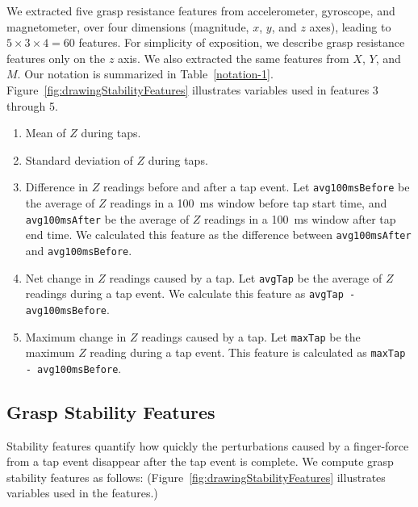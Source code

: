 We extracted five grasp resistance features from accelerometer, gyroscope, and magnetometer, over four dimensions (magnitude, $x$, $y$, and $z$ axes), leading to $5 \times 3 \times 4 = 60$ features. For simplicity of exposition, we describe grasp resistance features only on the $z$ axis. We also extracted the same features from $X$, $Y$, and $M$. Our notation is summarized in Table~\ref{notation-1}. Figure~\ref{fig:drawingStabilityFeatures} illustrates variables used in features 3 through 5.
\begin{enumerate}
\item Mean of $Z$ during taps. %
\item Standard deviation of $Z$ during taps.
%
%
\item Difference in $Z$  readings before and after a tap event. Let \texttt{avg100msBefore} be the average of $Z$ readings in a 100~ms  window before tap start time, and \texttt{avg100msAfter} be the average of $Z$ readings in a 100~ms  window after tap end time. We calculated this feature as the difference between \texttt{avg100msAfter} and \texttt{avg100msBefore}.
\item Net  change in $Z$ readings caused by a tap. Let  \texttt{avgTap} be the average of $Z$ readings during a tap event. We calculate this feature as  \texttt{avgTap - avg100msBefore}.
\item Maximum change in $Z$ readings caused by a tap. Let \texttt{maxTap} be the maximum $Z$ reading during a tap event. This feature is calculated as 
 \texttt{maxTap - avg100msBefore}.
\end{enumerate}




%
\subsection{Grasp Stability Features} 
Stability features quantify how quickly the perturbations caused by a finger-force from a tap event disappear after the tap event is complete.
%
%
We compute grasp stability features as follows:
(Figure~\ref{fig:drawingStabilityFeatures} illustrates variables used in the features.)
%
%
%
%
%

